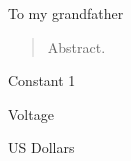 \begin{dedication}
To my grandfather
\end{dedication}


\begin{abstract}
  Abstract.
\end{abstract}


\tableofcontents
\listoftables
\listoffigures

\begin{nomenclature}
\begin{description}
\item{} Constant 1

\item{}    Voltage 

\item{\makebox[0.75in][l]{\$}}     US Dollars
\end{description}
\end{nomenclature}

\cleardoublepage{} %
